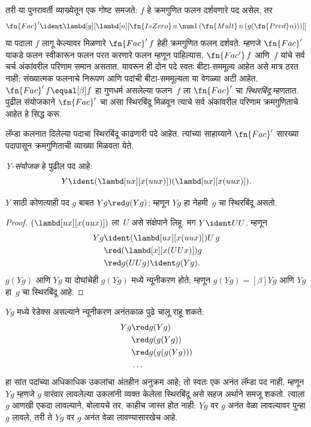 तरी या पुनरावर्ती व्याख्येतून एक गोष्ट समजते:
$f$ हे क्रमगुणित फलन दर्शवणारे पद असेल, तर
\[\fn{Fac}' \ident \lambd[g][\lambd[n][\fn{IsZero} \, n \, \num 1\, (\fn{Mult} \, n\, (g (\fn{Pred} n)))]]
\]
या पदाला $f$ लागू केल्यावर मिळणारे
$\fn{Fac}'\,f$ हेही क्रमगुणित फलन दर्शवते.
म्हणजे $\fn{Fac}'$ याकडे फलन स्वीकारून फलन
परत करणारे फलन म्हणून पाहिल्यास, $\fn{Fac'}\, f$
आणि~$f$ यांचे सर्व चर्च अंकांवरील परिणाम समान असतात.
यावरून ही दोन पदे स्वतः बीटा-सममूल्य आहेत असे मात्र
ठरत नाही; संख्यात्मक फलनाचे निरूपण आणि पदांची
बीटा-सममूल्यता या वेगळ्या अटी आहेत. $\fn{Fac}' \, f \equal[\beta] f$
हा गुणधर्म असलेल्या फलन~$f$ ला $\fn{Fac}'$
चा \emph{स्थिरबिंदू} म्हणतात. पुढील संयोजकाने
$\fn{Fac}'$ चा असा स्थिरबिंदू मिळवून त्याचे सर्व
अंकांवरील परिणाम क्रमगुणिताचे आहेत हे सिद्ध करू.

लॅम्डा कलनात दिलेल्या पदाचा स्थिरबिंदू काढणारी
पदे आहेत. त्यांच्या साहाय्याने $\fn{Fac}'$
सारख्या पदापासून क्रमगुणिताची व्याख्या मिळवता येते.

\begin{defn}
  \label{lam:ldf:fp:defn:Turing-Y}
  \emph{Y-संयोजक} हे पुढील पद आहे:
  \[  Y \ident (\lambd[ux][x(uux)])(\lambd[ux][x(uux)]).
  \]
\end{defn}

\begin{thm}
  $Y$ साठी कोणत्याही पद $g$ बाबत $Yg \red g(Yg)$; म्हणून
  $Yg$ हा नेहमी~$g$ चा स्थिरबिंदू असतो.
\end{thm}

\begin{proof}
  $(\lambd[ux][x(uux)])$ ला~$U$ असे संक्षेपाने
  लिहू. मग $Y \ident UU$. म्हणून
  \begin{align*}
    Y g &\ident (\lambd[ux][x(uux)])U\,g \\
    &\red (\lambd[x][x(UUx)])g\\
    & \red g(UUg) \ident g(Yg).
  \end{align*}
  $g(Yg)$ आणि $Yg$ या दोघांचेही $g(Yg)$ मध्ये
  न्यूनीकरण होते; म्हणून $g(Yg) \equal[\beta]
  Yg$ आणि $Yg$ हा~$g$ चा स्थिरबिंदू आहे.
\end{proof}

$Yg$ मध्ये रेडेक्स असल्याने न्यूनीकरण अनंतकाळ
पुढे चालू राहू शकते:
\begin{align*}
  Y g &\red g (Y g) \\
    &\red g (g (Y g)) \\
    &\red g(g (g (Y g)))\\
    &\ldots
\end{align*}
हा सांत पदांच्या अधिकाधिक उकलांचा अंतहीन अनुक्रम आहे;
तो स्वतः एक अनंत लॅम्डा पद नाही. म्हणून $Yg$ म्हणजे $g$
वारंवार लावलेल्या उकलांनी व्यक्त केलेला स्थिरबिंदू असे
सहज अर्थाने समजू शकतो. त्याला $g$ आणखी एकदा
लावल्याने, बोलायचे तर, काहीच जास्त होत नाही:
$Yg$ वर $g$ अनंत वेळा लावल्यावर पुन्हा $g$
लावले, तरी ते $Yg$ वर $g$ अनंत वेळा लावण्यासारखेच आहे.

